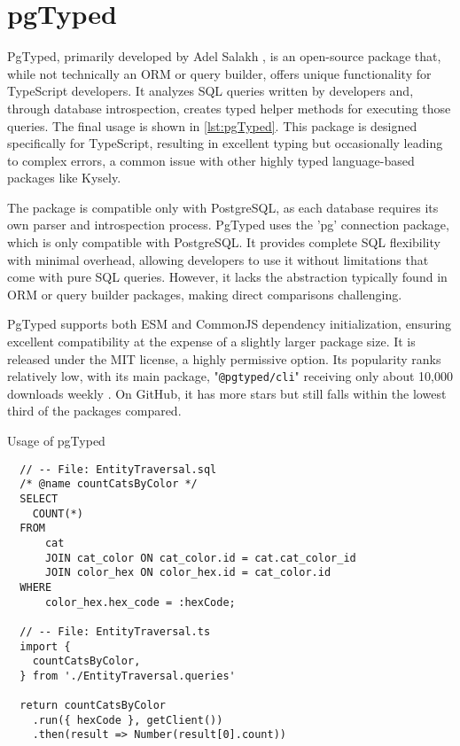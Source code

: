 \section{pgTyped}
PgTyped, primarily developed by Adel Salakh \cite{pgTyped}, is an open-source
package that, while not technically an ORM or query builder, offers unique
functionality for TypeScript developers. It analyzes SQL queries written by
developers and, through database introspection, creates typed helper methods for
executing those queries. The final usage is shown in \autoref{lst:pgTyped}. This
package is designed specifically for TypeScript, resulting in excellent typing
but occasionally leading to complex errors, a common issue with other highly
typed language-based packages like Kysely.

The package is compatible only with PostgreSQL, as each database requires its
own parser and introspection process. PgTyped uses the 'pg' connection package,
which is only compatible with PostgreSQL. It provides complete SQL flexibility
with minimal overhead, allowing developers to use it without limitations that
come with pure SQL queries. However, it lacks the abstraction typically found in
ORM or query builder packages, making direct comparisons challenging.

PgTyped supports both ESM and CommonJS dependency initialization, ensuring
excellent compatibility at the expense of a slightly larger package size. It is
released under the MIT license, a highly permissive option. Its popularity ranks
relatively low, with its main package, "\texttt{@pgtyped/cli}" receiving only
about 10,000 downloads weekly \cite{pgtyped/cli}. On GitHub, it has more stars
but still falls within the lowest third of the packages compared.

\begin{listing}[ht]
  \caption{Usage of pgTyped}
  \label{lst:pgTyped}
  \begin{verbatim}
  // -- File: EntityTraversal.sql
  /* @name countCatsByColor */
  SELECT
    COUNT(*)
  FROM
      cat
      JOIN cat_color ON cat_color.id = cat.cat_color_id
      JOIN color_hex ON color_hex.id = cat_color.id
  WHERE
      color_hex.hex_code = :hexCode;
  
  // -- File: EntityTraversal.ts 
  import {
    countCatsByColor,
  } from './EntityTraversal.queries'
  
  return countCatsByColor
    .run({ hexCode }, getClient())
    .then(result => Number(result[0].count))
  
  \end{verbatim}
\end{listing}

